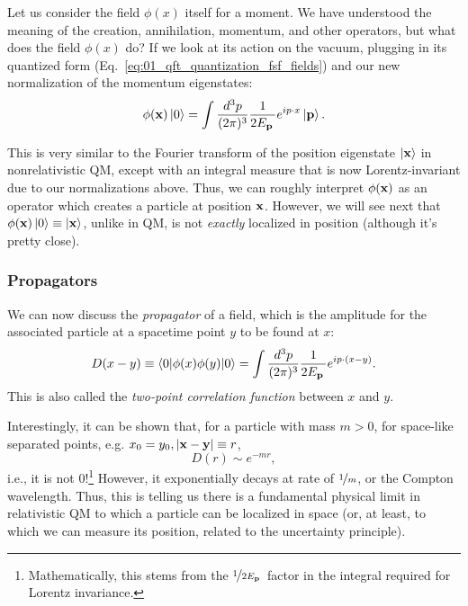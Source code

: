 Let us consider the field $\phi(x)$ itself for a moment.
We have understood the meaning of the creation, annihilation, momentum, and other operators, but what does the field $\phi(x)$ do?
If we look at its action on the vacuum, plugging in its quantized form (Eq.~\ref{eq:01_qft_quantization_fsf_fields}) and our new normalization of the momentum eigenstates:
\begin{equation}
    \label{eq:01_qft_quantization_field_vacuum}
    \phi(\mathbf{x})\ket{0} = \int \frac{d^3p}{(2\pi)^3} \frac{1}{2E_{\mathbf{p}}\,} e^{ip\cdot x}\ket{\mathbf{p}}.
\end{equation}

This is very similar to the Fourier transform of the position eigenstate $\ket{\mathbf{x}}$ in nonrelativistic QM, except with an integral measure that is now Lorentz-invariant due to our normalizations above.
Thus, we can roughly interpret $\phi(\mathbf{x})$ as an operator which creates a particle at position $\mathbf{x}$.
However, we will see next that $\phi(\mathbf{x})\ket{0} \equiv \ket{\mathbf{x}}$, unlike in QM, is not \textit{exactly} localized in position (although it's pretty close).


\subsubsection{Propagators}

We can now discuss the \textit{propagator} of a field, which is the amplitude for the associated particle at a spacetime point $y$ to be found at $x$:
\begin{equation}
    \label{eq:01_qft_quantization_propagator}
    D(x - y) \equiv \braket{0|\phi(x)\phi(y)|0} = \int \frac{d^3p}{(2\pi)^3} \frac{1}{2E_{\mathbf{p}}\,} e^{ip\cdot (x - y)}.
\end{equation}
This is also called the \textit{two-point correlation function} between $x$ and $y$.

Interestingly, it can be shown that, for a particle with mass $m > 0$, for space-like separated points, e.g. $x_0 = y_0, \left\lvert \mathbf{x} - \mathbf{y} \right\rvert \equiv r$,
\begin{equation}
	\label{eq:01_qft_quantization_propagator_spacelike}
	D(r) \sim e^{-mr},
\end{equation}
i.e., it is not 0!\footnote{Mathematically, this stems from the $\cnicefrac{1}{2\svecp E}$ factor in the integral required for Lorentz invariance.}
However, it exponentially decays at rate of $\cnicefrac{1}{m}$, or the Compton wavelength.
Thus, this is telling us there is a fundamental physical limit in relativistic QM to which a particle can be localized in space (or, at least, to which we can measure its position, related to the uncertainty principle).

